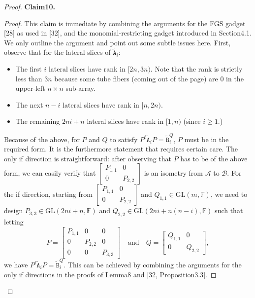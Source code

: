 \documentclass[10pt,a4paper]{article}
\newenvironment{authorclaim}[1]{\par\medskip\noindent\textbf{#1.}\ }{\par\medskip}
\begin{document}
\begin{proof}
\begin{authorclaim}{Claim10}
\end{authorclaim}
\begin{proof}
This claim is immediate by combining the arguments for the FGS gadget [28] as used in [32], and the monomial-restricting gadget introduced in Section4.1. We only outline the argument and point out some subtle issues here.
First, observe that for the lateral slices of $\widetilde{\mathtt A}_i$:
\begin{itemize}
\item The first $i$ lateral slices have rank in $[2n,3n)$. Note that the rank is strictly less than $3n$ because some tube fibers (coming out of the page) are 0 in the upper-left $n\times n$ sub-array.
\item The next $n-i$ lateral slices have rank in $[n,2n)$.
\item The remaining $2ni+n$ lateral slices have rank in $[1,n)$ (since $i\ge1$.)
\end{itemize}
Because of the above, for $P$ and $Q$ to satisfy $P^t\widetilde{\mathtt A}_iP=\widetilde{\mathtt B}_i^Q$, $P$ must be in the required form.
It is the furthermore statement that requires certain care. The only if direction is straightforward: after observing that $P$ has to be of the above form, we can easily verify that $\begin{bmatrix}P_{1,1}&0\\0&P_{2,2}\end{bmatrix}$ is an isometry from $\mathcal A$ to $\mathcal B$. For the if direction, starting from $\begin{bmatrix}P_{1,1}&0\\0&P_{2,2}\end{bmatrix}$ and $Q_{1,1}\in\mathrm{GL}(m,\mathbb F)$, we need to design $P_{3,3}\in\mathrm{GL}(2ni+n,\mathbb F)$ and $Q_{2,2}\in\mathrm{GL}(2ni+n(n-i),\mathbb F)$ such that letting
\[P=\begin{bmatrix}P_{1,1}&0&0\\0&P_{2,2}&0\\0&0&P_{3,3}\end{bmatrix}\quad\text{and}\quad Q=\begin{bmatrix}Q_{1,1}&0\\0&Q_{2,2}\end{bmatrix},\]
we have $P^t\widetilde{\mathtt A}_iP=\widetilde{\mathtt B}_i^Q$. This can be achieved by combining the arguments for the only if directions in the proofs of Lemma8 and [32, Proposition3.3].
\end{proof}

\end{proof}
\end{document}
